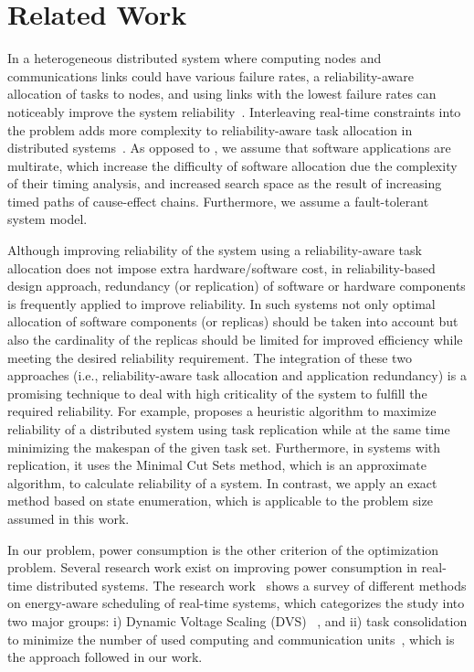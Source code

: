\section{Related Work}\label{sec_RW}
In a heterogeneous distributed system where computing nodes and communications links could have various failure rates, a reliability-aware allocation of tasks to nodes, and using links with the lowest failure rates can noticeably improve the system reliability~\cite{shatz1992task}\cite{kartik1997task}\cite{yin2007task}\cite{zhang2015maximizing}. Interleaving real-time constraints into the problem adds more complexity to reliability-aware task allocation in distributed systems~\cite{faragardi2013optimal}. As opposed to \cite{Wozniak2013AnArchitectures}\cite{Saidi2015AnArchitectures}, we assume that software applications are multirate, which increase the difficulty of software allocation due the complexity of their timing analysis, and increased search space as the result of increasing timed paths of cause-effect chains. Furthermore, we assume a fault-tolerant system model.

Although improving reliability of the system using a reliability-aware task allocation does not impose extra hardware/software cost,  in reliability-based design approach, redundancy (or replication) of software or hardware components is frequently applied to improve reliability. In such systems not only optimal allocation of software components (or replicas) should be taken into account but also the cardinality of the replicas should be limited for improved efficiency while meeting the desired reliability requirement. The integration of these two approaches (i.e., reliability-aware task allocation and application redundancy) is a promising technique to deal with high criticality of the system to fulfill the required reliability. For example, \cite{assayad2004bi} proposes a heuristic algorithm to maximize reliability of a distributed system using task replication while at the same time minimizing the makespan of the given task set. Furthermore, in systems with replication, it uses the Minimal Cut Sets method, which is an approximate algorithm, to calculate reliability of a system. In contrast, we apply an exact method based on state enumeration, which is applicable to the problem size assumed in this work.\vspace{-0.02cm}

In our problem, power consumption is the other criterion of the optimization problem. Several research work exist on improving power consumption in real-time distributed systems. The research work~\cite{bambagini2016energy} shows a survey of different methods on energy-aware scheduling of real-time systems, which categorizes the study into two major groups: i) Dynamic Voltage Scaling (DVS) ~\cite{devadas2012interplay}\cite{wang2015dynamic}, and ii) task consolidation to minimize the number of used computing and communication units~\cite{faragardi2013towards}, which is the approach followed in our work.\vspace{-0.02cm}

